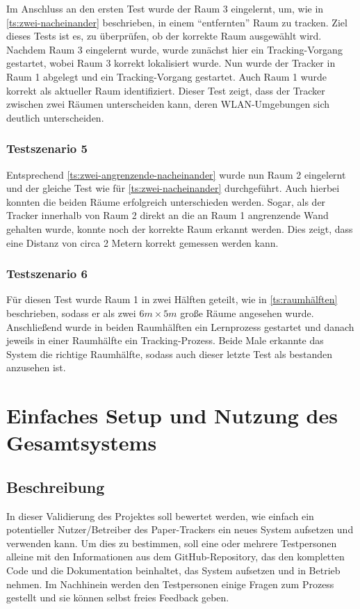 Im Anschluss an den ersten Test wurde der Raum 3 eingelernt, um, wie in \ref{ts:zwei-nacheinander}
beschrieben, in einem \enquote{entfernten} Raum zu tracken. Ziel dieses Tests ist es, zu überprüfen,
ob der korrekte Raum ausgewählt wird. Nachdem Raum 3 eingelernt wurde, wurde zunächst hier ein
Tracking-Vorgang gestartet, wobei Raum 3 korrekt lokalisiert wurde. Nun wurde der Tracker in
Raum 1 abgelegt und ein Tracking-Vorgang gestartet. Auch Raum 1 wurde korrekt als aktueller Raum
identifiziert.
Dieser Test zeigt, dass der Tracker zwischen zwei Räumen unterscheiden kann, deren
\gls{WLAN}-Umgebungen sich deutlich unterscheiden.

\subsubsection{Testszenario 5}

Entsprechend \ref{ts:zwei-angrenzende-nacheinander} wurde nun Raum 2 eingelernt und der gleiche Test
wie für \ref{ts:zwei-nacheinander} durchgeführt. Auch hierbei konnten die beiden Räume erfolgreich
unterschieden werden.
Sogar, als der Tracker innerhalb von Raum 2 direkt an die an Raum 1 angrenzende Wand gehalten wurde,
konnte noch der korrekte Raum erkannt werden. Dies zeigt, dass eine Distanz von circa 2 Metern
korrekt gemessen werden kann.

\subsubsection{Testszenario 6}

Für diesen Test wurde Raum 1 in zwei Hälften geteilt, wie in \ref{ts:raumhälften} beschrieben,
sodass er als zwei $6m\times5m$ große Räume angesehen wurde.
Anschließend wurde in beiden Raumhälften ein Lernprozess gestartet und danach jeweils in einer
Raumhälfte ein Tracking-Prozess. Beide Male erkannte das System die richtige Raumhälfte, sodass auch
dieser letzte Test als bestanden anzusehen ist.

\section{Einfaches Setup und Nutzung des Gesamtsystems} \label{sec:validation-setup-usability}
\subsection{Beschreibung}
In dieser Validierung des Projektes soll bewertet werden, wie einfach ein potentieller Nutzer/Betreiber
des Paper-Trackers ein neues System aufsetzen und verwenden kann.
Um dies zu bestimmen, soll eine oder mehrere Testpersonen alleine mit den Informationen aus dem GitHub-Repository, das
den kompletten Code und die Dokumentation beinhaltet, das System aufsetzen und in Betrieb nehmen.
Im Nachhinein werden den Testpersonen einige Fragen zum Prozess gestellt und sie können selbst
freies Feedback geben.

